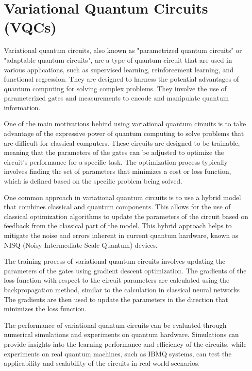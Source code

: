\documentclass[inscr,ack,preface]{diphdthesis}
\begin{document}
\section{Variational Quantum Circuits (VQCs)}

Variational quantum circuits, also known as "parametrized quantum circuits" or "adaptable quantum circuits", are a type of quantum circuit that are used in various applications, such as supervised learning, reinforcement learning, and functional regression. They are designed to harness the potential advantages of quantum computing for solving complex problems. They involve the use of parameterized gates and measurements to encode and manipulate quantum information.

One of the main motivations behind using variational quantum circuits is to take advantage of the expressive power of quantum computing to solve problems that are difficult for classical computers. These circuits are designed to be trainable, meaning that the parameters of the gates can be adjusted to optimize the circuit's performance for a specific task. The optimization process typically involves finding the set of parameters that minimizes a cost or loss function, which is defined based on the specific problem being solved\cite{vqc}.

One common approach in variational quantum circuits is to use a hybrid model that combines classical and quantum components. This allows for the use of classical optimization algorithms to update the parameters of the circuit based on feedback from the classical part of the model. This hybrid approach helps to mitigate the noise and errors inherent in current quantum hardware, known as NISQ (Noisy Intermediate-Scale Quantum) devices\cite{vqc2}.

The training process of variational quantum circuits involves updating the parameters of the gates using gradient descent optimization. The gradients of the loss function with respect to the circuit parameters are calculated using the backpropagation method, similar to the calculation in classical neural networks \cite{vqc_arch}. The gradients are then used to update the parameters in the direction that minimizes the loss function.

The performance of variational quantum circuits can be evaluated through numerical simulations and experiments on quantum hardware. Simulations can provide insights into the learning performance and efficiency of the circuits, while experiments on real quantum machines, such as IBMQ systems, can test the applicability and scalability of the circuits in real-world scenarios.
\end{document}
